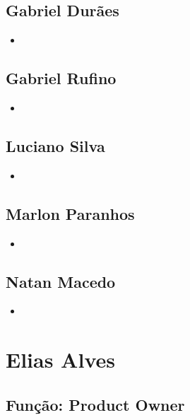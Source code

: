 \documentclass[a4paper, 12pt]{article}
\begin{document}
\subsection*{Gabriel Durães}
\begin{itemize}
	\item 
\end{itemize}

\subsection*{Gabriel Rufino}
\begin{itemize}
	\item 
\end{itemize}

\subsection*{Luciano Silva}
\begin{itemize}
	\item 
\end{itemize}

\subsection*{Marlon Paranhos}
\begin{itemize}
	\item 
\end{itemize}

\subsection*{Natan Macedo}
\begin{itemize}
	\item 
\end{itemize}

	

\clearpage


\section*{Elias Alves}
\subsection*{Função: Product Owner}
\end{document}
